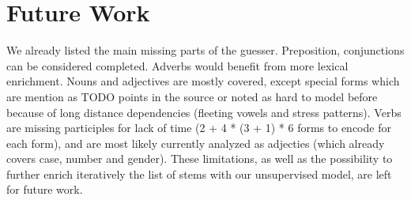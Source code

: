 \documentclass[11pt,letterpaper]{article}
\begin{document}
\section{Future Work}
We already listed the main missing parts of the guesser. Preposition, conjunctions can be considered completed. Adverbs would benefit from more lexical enrichment. Nouns and adjectives are mostly covered, except special forms which are mention as TODO points in the source or noted as hard to model before because of long distance dependencies (fleeting vowels and stress patterns). Verbs are missing participles for lack of time (2 + 4 * (3 + 1) * 6 forms to encode for each form), and are most likely currently analyzed as adjecties (which already covers case, number and gender). These limitations, as well as the possibility to further enrich iteratively the list of stems with our unsupervised model, are left for future work.




\label{lastpage}
\end{document}
